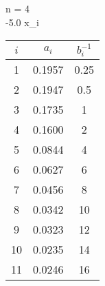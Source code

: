 \begin{Enumerate}
%
%
\item	{} 
	\begin{Cst} 
	n = 4 \\ 
	-5.0 \leq x_i  \\ 
	\end{Cst} 
	\begin{center} 
	\begin{tabular}{|c|c|c|}\hline 
	$i$ & $a_i$ & $b_i^{-1}$ \\ \hline 
	1 & 0.1957 & 0.25 \\ 
	2 & 0.1947 & 0.5 \\ 
	3 & 0.1735 & 1 \\ 
	4 & 0.1600 & 2 \\ 
	5 & 0.0844 & 4 \\ 
	6 & 0.0627 & 6 \\ 
	7 & 0.0456 & 8 \\ 
	8 & 0.0342 & 10 \\ 
	9 & 0.0323 & 12 \\ 
	10 & 0.0235 & 14 \\ 
	11 & 0.0246 & 16 \\ \hline 
	\end{tabular} 
	\end{center} 
%
%
\end{Enumerate}


